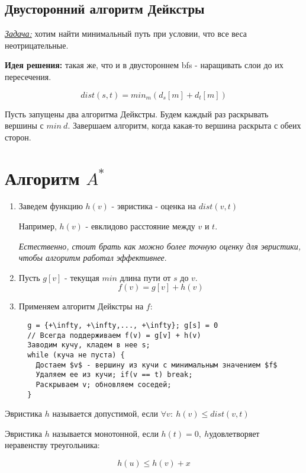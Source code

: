 
\subsection{Двусторонний алгоритм Дейкстры}
\textit{\underline{Задача:}} хотим найти минимальный путь при условии, что все веса неотрицательные.

\textbf{Идея решения:} такая же, что и в двустороннем bfs - наращивать слои до их пересечения. 

$$dist(s, t) = min_m(d_s[m] + d_t[m])$$

Пусть запущены два алгоритма Дейкстры. Будем каждый раз раскрывать вершины с $min\ d$. Завершаем алгоритм, когда какая-то вершина раскрыта с обеих сторон.

\section{Алгоритм $A^*$}

\begin{enumerate}
  \item Заведем функцию $h(v)$ - эвристика - оценка на $dist(v, t)$

Например, $h(v)$ - евклидово расстояние между $v$ и $t$.

\textit{Естественно, стоит брать как можно более точную оценку для эвристики, чтобы алгоритм работал эффективнее}.

\item  Пусть $g[v]$ - текущая $min$ длина пути от $s$ до $v$.
$$f(v) = g[v] + h(v)$$

\item Применяем алгоритм Дейкстры на $f$:
\begin{verbatim}
  g = {+\infty, +\infty,..., +\infty}; g[s] = 0
  // Всегда поддерживаем f(v) = g[v] + h(v)
  Заводим кучу, кладем в нее s;
  while (куча не пуста) {
    Достаем $v$ - вершину из кучи с минимальным значением $f$
    Удаляем ее из кучи; if(v == t) break;
    Раскрываем v; обновляем соседей;
  }
\end{verbatim}
\end{enumerate}

\begin{definition}
  Эвристика $h$ называется допустимой, если $\forall v: \ h(v) \le dist(v, t)$
\end{definition}

\begin{definition}
  Эвристика $h$ называется монотонной, если $h(t) = 0, \ h $удовлетворяет неравенству треугольника:

  $$h(u) \le h(v) + x$$
\end{definition}



